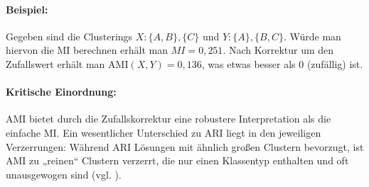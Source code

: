 \paragraph{Beispiel:}
Gegeben sind die Clusterings \(X: \{A,B\}, \{C\}\) und \(Y: \{A\}, \{B,C\}\).
Würde man hiervon die \ac{MI} berechnen erhält man \(MI = 0{,}251\). 
Nach Korrektur um den Zufallswert erhält man \(\mathrm{AMI}(X,Y) = 0{,}136\), was etwas besser als 0 (zufällig) ist.

\paragraph{Kritische Einordnung:}
\ac{AMI} bietet durch die Zufallskorrektur eine robustere Interpretation als
die einfache \ac{MI}. Ein wesentlicher Unterschied zu \ac{ARI} liegt in den
jeweiligen Verzerrungen: Während \ac{ARI} Lösungen mit ähnlich großen Clustern
bevorzugt, ist \ac{AMI} zu „reinen“ Clustern verzerrt, die nur einen Klassentyp
enthalten und oft unausgewogen sind (vgl. \cite{Miller2024}). 
